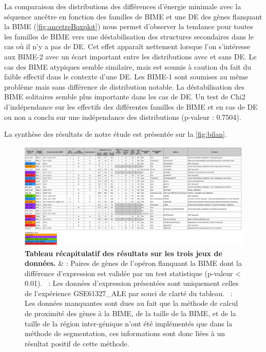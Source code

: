 \documentclass[12pt,a4paper]{report}
\begin{document}
\begin{onehalfspace}
La comparaison des distributions des différences d'énergie minimale avec la séquence ancêtre en fonction des familles de BIME et une DE des gènes flanquant la BIME (\autoref{fig:ancetreBoxplot}) nous permet d'observer la tendance pour toutes les familles de BIME vers une déstabilisation des structures secondaires dans le cas où il n'y a pas de DE. Cet effet apparaît nettement lorsque l'on s'intéresse aux BIME-2 avec un écart important entre les distributions avec et sans DE. Le cas des BIME atypiques semble similaire, mais est soumis à caution du fait du faible effectif dans le contexte d'une DE. Les BIME-1 sont soumises au même problème mais sans différence de distribution notable. La déstabilisation des BIME solitaires semble plus importante dans les cas de DE.
Un test de Chi2 d'indépendance sur les effectifs des différentes familles de BIME et en cas de DE ou non a conclu sur une indépendance des distributions (p-valeur : 0.7504).

La synthèse des résultats de notre étude est présentée sur la \autoref{fig:bilan}.

\begin{figure}
\centerline{\includegraphics[scale=0.85]{figures/synthese_french.png}}
\caption{\textbf{Tableau récapitulatif des résultats sur les trois jeux de données.} \& : Paires de gènes de l'opéron flanquant la BIME dont la différence d'expression est validée par un test statistique (p-valeur < 0.01). \dag~: Les données d'expression présentées sont uniquement celles de l'expérience GSE61327\_ALE par souci de clarté du tableau. \ddag~: Les données manquantes sont dues au fait que la méthode de calcul de proximité des gènes à la BIME, de la taille de la BIME, et de la taille de la région inter-génique n'ont été implémentés que dans la méthode de segmentation, ces informations sont donc liées à un résultat positif de cette méthode.}
\label{fig:bilan}
\end{figure}


\end{onehalfspace}
\end{document}
